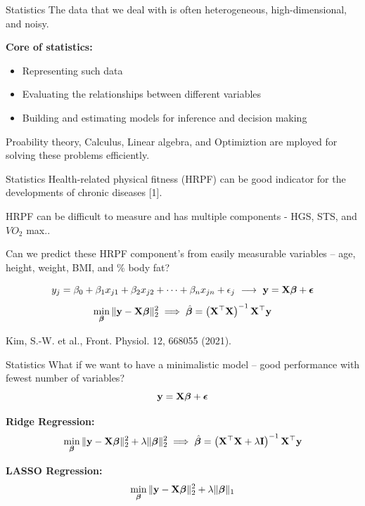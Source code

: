 \documentclass[aspectratio=169]{beamer}
\let\olditem\item
\renewcommand{\item}{\setlength{\itemsep}{\fill}\olditem}
\def\mf{\ensuremath\mathbf}
\def\lp{\ensuremath\left(}
\def\rp{\ensuremath\right)}
\begin{document}
\begin{frame}{Statistics}
  The data that we deal with is often heterogeneous, high-dimensional, and noisy.
  \vspace{1cm}
  
  \textbf{Core of statistics:}
  \begin{itemize}
    \item Representing such data
    \item Evaluating the relationships between different variables
    \item Building and estimating models for inference and decision making
  \end{itemize}
  \vspace{1cm}
  
  Proability theory, Calculus, Linear algebra, and Optimiztion are mployed for solving these problems efficiently.
\end{frame}


\begin{frame}{Statistics}
  Health-related physical fitness (HRPF) can be good indicator for the developments of chronic diseases [1].

  HRPF can be difficult to measure and has multiple components - HGS, STS, and $VO_2$ max.. 
  
  Can we predict these HRPF component's from easily measurable variables -- age, height, weight, BMI, and \% body fat?

  \[ y_j = \beta_0 + \beta_1 x_{j1} + \beta_2 x_{j2} + \cdots + \beta_n x_{jn} + \epsilon_j \,\, \longrightarrow \,\, \mf{y} = \mf{X}\bm{\beta} + \bm{\epsilon} \]
  \[ \min_{\bm{\beta}} \Vert \mf{y} - \mf{X}\bm{\beta}\Vert_2^2 \implies \hat{\bm{\beta}} = \lp \mf{X}^\top{\mf{X}} \rp^{-1}\mf{X}^\top\mf{y} \]

  \vspace{0.75cm}

  \begin{small}
    [1] Kim, S.-W. et al., Front. Physiol. 12, 668055 (2021).
  \end{small}
\end{frame}


\begin{frame}{Statistics}
  What if we want to have a minimalistic model --  good performance with fewest number of variables?
  \[ \mf{y} = \mf{X}\bm{\beta} + \bm{\epsilon} \]

  \textbf{Ridge Regression:}
  \[ \min_{\bm{\beta}} \Vert \mf{y} - \mf{X}\bm{\beta}\Vert_2^2 + \lambda \Vert \bm{\beta} \Vert_2^2 \implies \hat{\bm{\beta}} = \lp \mf{X}^\top{\mf{X}} + \lambda \mf{I} \rp^{-1}\mf{X}^\top\mf{y} \]

  \vspace{0.7cm}

  \textbf{LASSO Regression:}
  \[ \min_{\bm{\beta}} \Vert \mf{y} - \mf{X}\bm{\beta}\Vert_2^2 + \lambda \Vert \bm{\beta} \Vert_1 \]
\end{frame}
\end{document}
